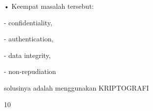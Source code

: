\documentclass{article}
\begin{document}

• Keempat masalah tersebut:


- confidentiality, 


- authentication, 


- data integrity, 


- non-repudiation 

   solusinya adalah menggunakan KRIPTOGRAFI

10
\end{document}
